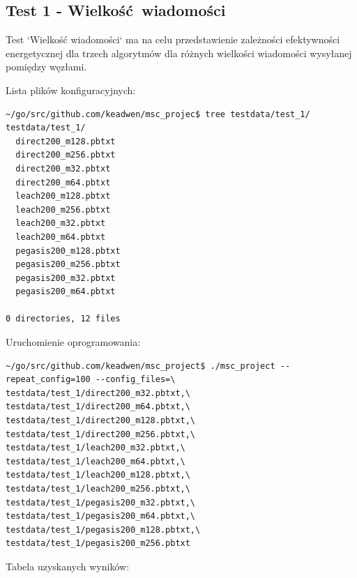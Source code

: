 \documentclass[a4paper,12pt,twoside,openany]{report}
\begin{document}

\subsection{Test 1 - Wielkość wiadomości}

Test `Wielkość wiadomości` ma na celu przedstawienie zależności efektywności energetycznej dla trzech algorytmów dla różnych wielkości wiadomości wysyłanej pomiędzy węzłami.

Lista plików konfiguracyjnych:

\begin{lstlisting}
~/go/src/github.com/keadwen/msc_projec$ tree testdata/test_1/
testdata/test_1/
  direct200_m128.pbtxt
  direct200_m256.pbtxt
  direct200_m32.pbtxt
  direct200_m64.pbtxt
  leach200_m128.pbtxt
  leach200_m256.pbtxt
  leach200_m32.pbtxt
  leach200_m64.pbtxt
  pegasis200_m128.pbtxt
  pegasis200_m256.pbtxt
  pegasis200_m32.pbtxt
  pegasis200_m64.pbtxt

0 directories, 12 files
\end{lstlisting}


Uruchomienie oprogramowania:

\begin{lstlisting}
~/go/src/github.com/keadwen/msc_project$ ./msc_project --repeat_config=100 --config_files=\
testdata/test_1/direct200_m32.pbtxt,\
testdata/test_1/direct200_m64.pbtxt,\
testdata/test_1/direct200_m128.pbtxt,\
testdata/test_1/direct200_m256.pbtxt,\
testdata/test_1/leach200_m32.pbtxt,\
testdata/test_1/leach200_m64.pbtxt,\
testdata/test_1/leach200_m128.pbtxt,\
testdata/test_1/leach200_m256.pbtxt,\
testdata/test_1/pegasis200_m32.pbtxt,\
testdata/test_1/pegasis200_m64.pbtxt,\
testdata/test_1/pegasis200_m128.pbtxt,\
testdata/test_1/pegasis200_m256.pbtxt
\end{lstlisting}

Tabela uzyskanych wyników:
\end{document}
